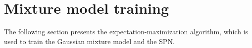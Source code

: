 




\newpage
\section{Mixture model training}
The following section presents the expectation-maximization algorithm, which is used to 
train the Gaussian mixture model and the SPN. 

